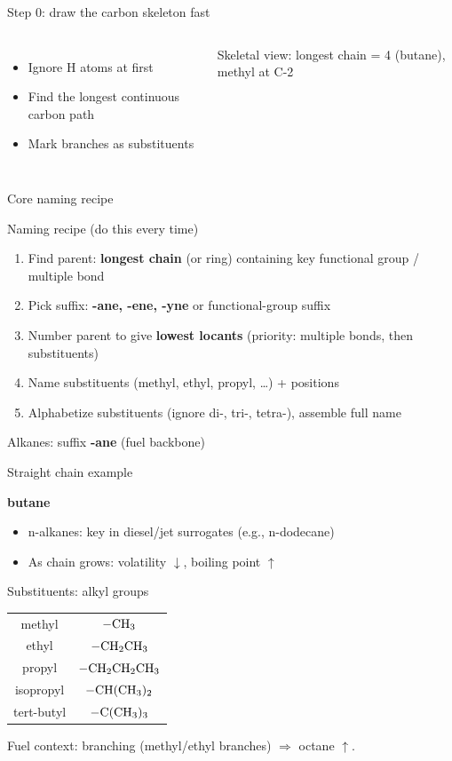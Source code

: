 \documentclass[aspectratio=169]{beamer}
\newcommand{\namingrecipe}{
\begin{block}{Naming recipe (do this every time)}
\begin{enumerate}
\item Find parent: \textbf{longest chain} (or ring) containing key functional group / multiple bond
\item Pick suffix: \textbf{-ane, -ene, -yne} or functional-group suffix
\item Number parent to give \textbf{lowest locants} (priority: multiple bonds, then substituents)
\item Name substituents (methyl, ethyl, propyl, \dots) + positions
\item Alphabetize substituents (ignore di-, tri-, tetra-), assemble full name
\end{enumerate}
\end{block}
}
\begin{document}
\begin{frame}{Step 0: draw the carbon skeleton fast}
\begin{columns}[T,onlytextwidth]
\begin{itemize}
\item Ignore H atoms at first
\item Find the longest continuous carbon path
\item Mark branches as substituents
\end{itemize}

\centering
{}

\vspace{1mm}
Skeletal view: longest chain = 4 (butane), methyl at C-2
\end{columns}
\end{frame}

\begin{frame}{Core naming recipe}
\namingrecipe
\end{frame}

\begin{frame}{Alkanes: suffix \textbf{-ane} (fuel backbone)}
\begin{block}{Straight chain example}
\centering
{}

\vspace{1mm}
\textbf{butane}
\end{block}

\begin{itemize}
\item n-alkanes: key in diesel/jet surrogates (e.g., n-dodecane)
\item As chain grows: volatility \(\downarrow\), boiling point \(\uparrow\)
\end{itemize}
\end{frame}

\begin{frame}{Substituents: alkyl groups}
\begin{center}
\begin{tabular}{c c}
methyl & \(\ce{-CH3}\) \\
ethyl & \(\ce{-CH2CH3}\) \\
propyl & \(\ce{-CH2CH2CH3}\) \\
isopropyl & \(\ce{-CH(CH3)2}\) \\
tert-butyl & \(\ce{-C(CH3)3}\) \\
\end{tabular}
\end{center}

\vspace{2mm}
Fuel context: branching (methyl/ethyl branches) \(\Rightarrow\) octane \(\uparrow\).
\end{frame}
\end{document}

